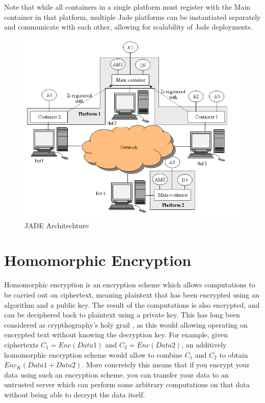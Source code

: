  Note that while all containers in a single platform must register with the Main container in that platform, multiple Jade platforms can be instantiated separately and communicate with each other, allowing for scalability of Jade deployments.
 
 \begin{figure}[h!]
 	\centering
	 	\includegraphics[width=\textwidth]{fig/jadeArchitecture}
	 	\caption{JADE Architechture}
	 	\label{fig:JADEarchitechture}
 \end{figure}



\section{Homomorphic Encryption}\label{sec:homomorphic_encryption}
Homomorphic encryption is an encryption scheme which allows computations to be carried out on ciphertext, meaning plaintext that has been encrypted using an algorithm and a public key. The result of the computations is also encrypted, and can be deciphered back to plaintext using a private key. This has long been considered as crypthography's holy grail \citep{Micciancio2011HomoEnc}, as this would allowing operating on encrypted text without knowing the decryption key. For example, given ciphertexts $C_1=Enc(Data1)$ and $C_2=Enc(Data2)$, an additively homomorphic encryption scheme would allow to combine $C_1$ and $C_2$ to obtain $Enc_K(Data1+Data2)$. More concretely this means that if you encrypt your data using such an encryption scheme, you can transfer your data to an untrusted server which can perform some arbitrary computations on that data without being able to decrypt the data itself.

